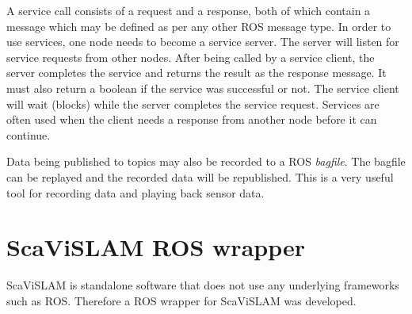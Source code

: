 A service call consists of a request and a response, both of which contain a message which may be defined as per any other ROS message type.  In order to use services, one node needs to become a service server.  The server will listen for service requests from other nodes.  After being called by a service client, the server completes the service and returns the result as the response message.  It must also return a boolean if the service was successful or not.  The service client will wait (blocks) while the server completes the service request.  Services are often used when the client needs a response from another node before it can continue.

Data being published to topics may also be recorded to a ROS \textit{bagfile}.  The bagfile can be replayed and the recorded data will be republished. This is a very useful tool for recording data and playing back sensor data.
 
\section{ScaViSLAM ROS wrapper}

ScaViSLAM is standalone software that does not use any underlying frameworks such as ROS.  Therefore a ROS wrapper for ScaViSLAM was developed. 

